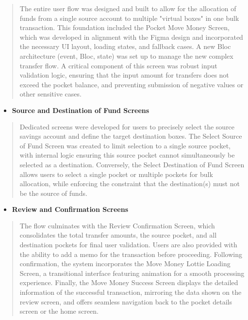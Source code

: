 \begin{quote}
The entire user flow was designed and built to allow for the allocation
of funds from a single source account to multiple "virtual boxes" in one
bulk transaction. This foundation included the Pocket Move Money Screen,
which was developed in alignment with the Figma design and incorporated
the necessary UI layout, loading states, and fallback cases. A new Bloc
architecture (event, Bloc, state) was set up to manage the new complex
transfer flow. A critical component of this screen was robust input
validation logic, ensuring that the input amount for transfers does not
exceed the pocket balance, and preventing submission of negative values
or other sensitive cases.
\end{quote}

\begin{itemize}
\item
  \textbf{Source and Destination of Fund Screens}
\end{itemize}

\begin{quote}
Dedicated screens were developed for users to precisely select the
source savings account and define the target destination boxes. The
Select Source of Fund Screen was created to limit selection to a single
source pocket, with internal logic ensuring this source pocket cannot
simultaneously be selected as a destination. Conversely, the Select
Destination of Fund Screen allows users to select a single pocket or
multiple pockets for bulk allocation, while enforcing the constraint
that the destination(s) must not be the source of funds.
\end{quote}

\begin{itemize}
\item
  \textbf{Review and Confirmation Screens}
\end{itemize}

\begin{quote}
The flow culminates with the Review Confirmation Screen, which
consolidates the total transfer amounts, the source pocket, and all
destination pockets for final user validation. Users are also provided
with the ability to add a memo for the transaction before proceeding.
Following confirmation, the system incorporates the Move Money Lottie
Loading Screen, a transitional interface featuring animation for a
smooth processing experience. Finally, the Move Money Success Screen
displays the detailed information of the successful transaction,
mirroring the data shown on the review screen, and offers seamless
navigation back to the pocket details screen or the home screen.
\end{quote}

